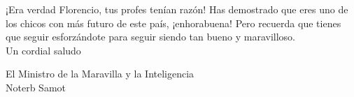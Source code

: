 \documentclass[svgnames,addpoints]{exam}
\begin{document}
\vspace*{1.6cm}

\begin{center}
  
    \begin{minipage}{13cm}

    ¡Era verdad Florencio, tus profes tenían razón! Has demostrado que eres uno de los chicos con más futuro de este país, ¡enhorabuena! Pero recuerda que tienes que seguir esforzándote para seguir siendo tan bueno y maravilloso.\\ 

    Un cordial saludo

    \vspace*{1.5cm}

    El Ministro de la  Maravilla y la Inteligencia\\
    Noterb Samot

    \end{minipage}
\end{center}
\end{document}
